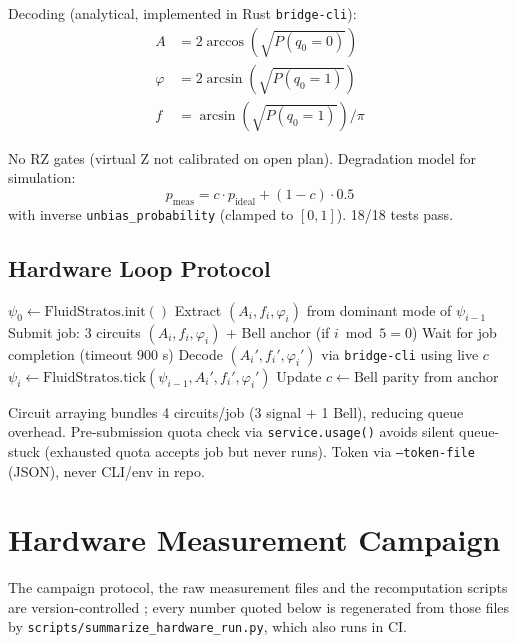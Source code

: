 \documentclass[sigconf,anonymous=false]{acmart}
\begin{document}
Decoding (analytical, implemented in Rust \texttt{bridge-cli}):
\begin{align}
A &= 2 \arccos(\sqrt{P(q_0=0)}) \\
\varphi &= 2 \arcsin(\sqrt{P(q_0=1)}) \\
f &= \arcsin(\sqrt{P(q_0=1)}) / \pi
\end{align}

No RZ gates (virtual Z not calibrated on open plan). Degradation model for simulation:
\begin{equation}
p_\text{meas} = c \cdot p_\text{ideal} + (1-c) \cdot 0.5
\end{equation}
with inverse \texttt{unbias\_probability} (clamped to $[0,1]$). 18/18 tests pass.

\subsection{Hardware Loop Protocol}

\begin{algorithm}
\caption{Quantum-Classical Hardware Loop}
\begin{algorithmic}[1]
\State $\psi_0 \gets \text{FluidStratos}.\text{init}()$
    \State Extract $(A_i, f_i, \varphi_i)$ from dominant mode of $\psi_{i-1}$
    \State Submit job: 3 circuits $(A_i, f_i, \varphi_i)$ + Bell anchor (if $i \bmod 5 = 0$)
    \State Wait for job completion (timeout 900 s)
    \State Decode $(A_i', f_i', \varphi_i')$ via \texttt{bridge-cli} using live $c$
    \State $\psi_i \gets \text{FluidStratos}.\text{tick}(\psi_{i-1}, A_i', f_i', \varphi_i')$
     \State Update $c \gets \text{Bell parity from anchor}$ \EndIf
\EndFor
\end{algorithmic}
\end{algorithm}

Circuit arraying bundles 4 circuits/job (3 signal + 1 Bell), reducing queue overhead. Pre-submission quota check via \texttt{service.usage()} avoids silent queue-stuck (exhausted quota accepts job but never runs). Token via \texttt{--token-file} (JSON), never CLI/env in repo.

\section{Hardware Measurement Campaign}

The campaign protocol, the raw measurement files and the recomputation scripts are
version-controlled \cite{QOI-hardware}; every number quoted below is regenerated from those
files by \texttt{scripts/summarize\_hardware\_run.py}, which also runs in CI.
\end{document}
